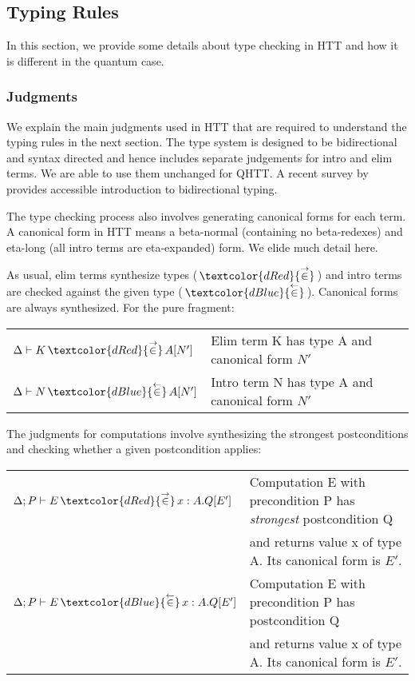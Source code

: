 \documentclass[acmsmall,nonacm,timestamp,review=false,anonymous=false]{acmart}
\newcommand{\chkcolor}{dBlue}
\newcommand{\syncolor}{dRed}
\newcommand{\chk}{\,\textcolor{\chkcolor}{{\stackrel{\leftarrow}{\in}}}\,}
\newcommand{\uncoloredsyn}{{{\stackrel{\rightarrow}{\in}}}}
\newcommand{\syn}{\,\textcolor{\syncolor}{\uncoloredsyn}\,}
\begin{document}
\subsection{Typing Rules}
\label{sec:typing}

In this section, we provide some details about type checking in HTT and how it is different in the quantum case.

\subsubsection{Judgments}
We explain the main judgments used in HTT that are required to understand the typing rules in the next section. The type system is designed to be bidirectional and syntax directed and hence includes separate judgements for intro and elim terms. We are able to use them unchanged for QHTT. A recent survey by \citet{dunfield2019bidirectional} provides accessible introduction to bidirectional typing.

The type checking process also involves generating canonical forms for each term. A canonical form in HTT means a beta-normal (containing no beta-redexes) and eta-long (all intro terms are eta-expanded) form. We elide much detail here.

As usual, elim terms synthesize types ($\syn$) and intro terms are checked against the given type ($\chk$). Canonical forms are always synthesized. For the pure fragment:

\begin{center}
	\begin{tabular}{ll}
		$\Delta \vdash K \syn A [N']$ & Elim term K has type A and canonical form $N'$ \\
		$\Delta \vdash N \chk A [N']$ & Intro term N has type A and canonical form $N'$
	\end{tabular}
\end{center}

The judgments for computations involve synthesizing the strongest postconditions and checking whether a given postcondition applies:

\begin{center}
	\begin{tabular}{ll}
		$\Delta; P \vdash E \syn x:A.Q[E']$ & Computation E with precondition P has \textit{strongest} postcondition Q\\ & and returns value x of type A. Its canonical form is $E'$. \\
		$\Delta; P \vdash E \chk x:A.Q[E']$ & Computation E with precondition P has postcondition Q\\ & and returns value x of type A. Its canonical form is $E'$.
	\end{tabular}
\end{center}
\end{document}
